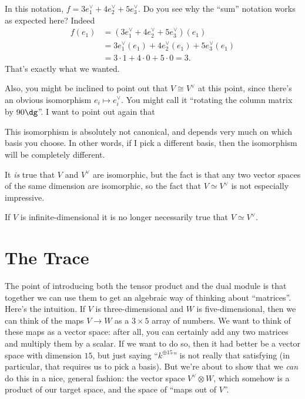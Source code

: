 \begin{example}
	In this notation, $f = 3e_1^\vee + 4e_2^\vee + 5e_3^\vee$.
	Do you see why the ``sum'' notation works as expected here?
	Indeed
	\begin{align*}
		f(e_1) &= (3e_1^\vee + 4e_2^\vee + 5e_3^\vee)(e_1) \\
		&= 3e_1^\vee(e_1) + 4e_2^\vee(e_1) + 5e_3^\vee(e_1) \\
		&= 3 \cdot 1 + 4 \cdot 0 + 5 \cdot 0 = 3.
	\end{align*}
	That's exactly what we wanted.
\end{example}

Also, you might be inclined to point out that $V \cong V^\vee$ at this point,
since there's an obvious isomorphism $e_i \mapsto e_i^\vee$.
You might call it ``rotating the column matrix by $90\dg$''.
I want to point out again that
\begin{itemize}
	\ii This isomorphism is absolutely not canonical,
	and depends very much on which basis you choose.
	In other words, if I pick a different basis, then the isomorphism
	will be completely different.

	It \emph{is} true that $V$ and $V^\vee$ are isomorphic,
	but the fact is that any two vector spaces of the same dimension are isomorphic, so the fact that $V \simeq V^\vee$ is not especially impressive.
	
	\ii If $V$ is infinite-dimensional it is no longer necessarily true that $V \simeq V^\vee$.
\end{itemize}

\section{The Trace}
The point of introducing both the tensor product and the dual module is that together
we can use them to get an algebraic way of thinking about ``matrices''.
Here's the intuition.
If $V$ is three-dimensional and $W$ is five-dimensional, then we can think
of the maps $V \to W$ as a $3 \times 5$ array of numbers.
We want to think of these maps as a vector space: after all, you can certainly add any two matrices and multiply them by a scalar.
If we want to do so, then it had better be a vector space with dimension $15$,
but just saying ``$k^{\oplus 15}$'' is not really that satisfying
(in particular, that requires us to pick a basis).
But we're about to show that we \emph{can} do this in a nice, general fashion:
the vector space $V^\vee \otimes W$, which somehow is a product of our target space,
and the space of ``maps out of $V$''.

